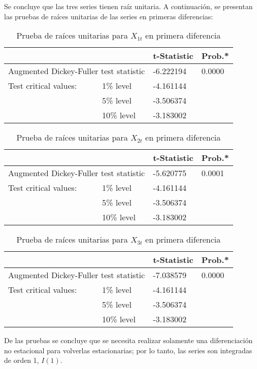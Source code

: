 Se concluye que las tres series tienen ra\'{i}z unitaria. A continuaci\'{o}n, se presentan las pruebas de ra\'{i}ces unitarias de las series en primeras diferencias:

\begin{table}[H]
\centering
\begin{tabular}{p{120pt}p{60pt}p{50pt}l} \hline \hline
& & t-Statistic & Prob.* \\ \hline \hline
\multicolumn{2}{p{180pt}}{Augmented Dickey-Fuller test statistic} & -6.222194 & 0.0000 \\ \hline
Test critical values: & 1{\%} level & -4.161144 & \\ 
 & 5{\%} level & -3.506374 & \\ 
 & 10{\%} level & -3.183002 & \\ \hline \hline
\end{tabular}
\caption{Prueba de ra\'{i}ces unitarias para $X_{1t}$ en primera diferencia}
\end{table}

\begin{table}[H]
\centering
\begin{tabular}{p{120pt}p{60pt}p{50pt}l} \hline \hline
& & t-Statistic & Prob.* \\ \hline \hline
\multicolumn{2}{p{180pt}}{Augmented Dickey-Fuller test statistic} & -5.620775 & 0.0001 \\ \hline
Test critical values: & 1{\%} level & -4.161144 & \\ 
 & 5{\%} level & -3.506374 & \\ 
 & 10{\%} level & -3.183002 & \\ \hline \hline
\end{tabular}
\caption{Prueba de ra\'{i}ces unitarias para $X_{2t}$ en primera diferencia}
\end{table}

\begin{table}[H]
\centering
\begin{tabular}{p{120pt}p{60pt}p{50pt}l} \hline \hline
& & t-Statistic & Prob.* \\ \hline \hline
\multicolumn{2}{p{180pt}}{Augmented Dickey-Fuller test statistic} & -7.038579 & 0.0000 \\ \hline
Test critical values: & 1{\%} level & -4.161144 & \\ 
 & 5{\%} level & -3.506374 & \\ 
 & 10{\%} level & -3.183002 & \\ \hline \hline
\end{tabular}
\caption{Prueba de ra\'{i}ces unitarias para $X_{3t}$ en primera diferencia}
\end{table}

De las pruebas se concluye que se necesita realizar solamente una diferenciaci\'{o}n no estacional para volverlas estacionarias; por lo tanto, las series son integradas de orden 1, $I(1)$.